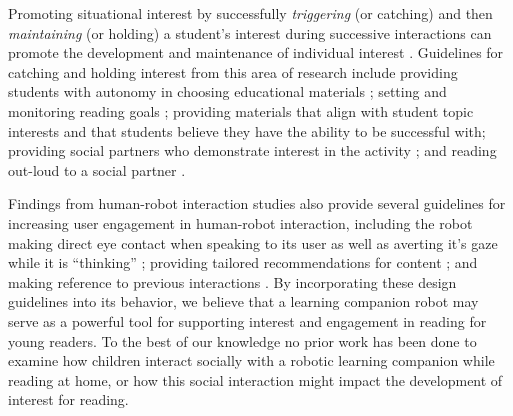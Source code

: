 \documentclass{sigchi}
\begin{document}
Promoting situational interest by successfully \textit{triggering} (or catching) and then \textit{maintaining} (or holding) a student's interest during successive interactions can promote the development and maintenance of individual interest \cite{Hidi:2006, Mitchell:1993}. Guidelines for catching and holding interest from this area of research include providing students with autonomy in choosing educational materials \cite{Jones:2011}; setting and monitoring reading goals \cite{Cabral:2015}; providing materials that align with student topic interests \cite{Ainley:2002} and that students believe they have the ability to be successful with; providing social partners who demonstrate interest in the activity \cite{Sansone:2005}; and reading out-loud to a social partner \cite{Rasinski:2003}. 

Findings from human-robot interaction studies also provide several guidelines for increasing user engagement in human-robot interaction, including the robot making direct eye contact when speaking to its user \cite{Mutlu:2011} as well as averting it's gaze while it is ``thinking'' \cite{Andrist:2014}; providing tailored recommendations for content \cite{Lim:2013}; and making reference to previous interactions \cite{Leite:2009}. By incorporating these design guidelines into its behavior, we believe that a learning companion robot may serve as a powerful tool for supporting interest and engagement in reading for young readers. {\color{blue}To the best of our knowledge no prior work has been done to examine how children interact socially with a robotic learning companion while reading at home, or how this social interaction might impact the development of interest for reading.}


\end{document}
